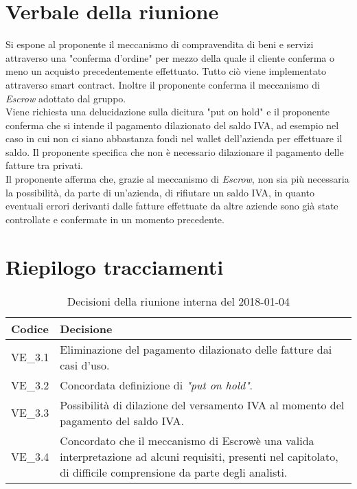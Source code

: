 \section{Verbale della riunione}
Si espone al proponente il meccanismo di compravendita di beni e servizi attraverso
una "conferma d'ordine\glo" per mezzo della quale il cliente conferma o meno un acquisto precedentemente effettuato.
Tutto ciò viene implementato attraverso smart contract\glo{}. Inoltre il proponente
conferma il meccanismo di \textit{Escrow\glo{}} adottato dal gruppo. \\
Viene richiesta una delucidazione sulla dicitura "put on hold" e il proponente conferma
che si intende il pagamento dilazionato del saldo IVA, ad esempio nel caso in cui non 
ci siano abbastanza fondi nel wallet\glo{} dell'azienda per effettuare il saldo. 
Il proponente specifica che non è necessario dilazionare il pagamento delle fatture 
tra privati. \\
Il proponente afferma che, grazie al meccanismo di \textit{Escrow\glo{}}, non sia più necessaria la possibilità, da parte di un'azienda, di rifiutare un saldo IVA, in quanto eventuali errori derivanti dalle fatture effettuate da altre aziende sono già state controllate e confermate in un momento precedente.

\pagebreak

\section{Riepilogo tracciamenti}

	
\begin{longtable}{ >{\centering}p{} >{}p{}}
	\caption{Decisioni della riunione interna del 2018-01-04}\\	
	\rowcolorhead
	\textbf{\color{white}Codice} 
	& \centering\textbf{\color{white}Decisione} 
	\tabularnewline 
	\endfirsthead
		VE\_3.1 & Eliminazione del pagamento dilazionato delle fatture dai casi d'uso.
		
		\tabularnewline 
		VE\_3.2 & Concordata definizione di \textit{"put on hold"}.
		
		\tabularnewline 
		VE\_3.3 & Possibilità di dilazione del versamento IVA al momento del 
						pagamento del saldo IVA.
		\tabularnewline 
		VE\_3.4 & Concordato che il meccanismo di Escrow\glosp è una valida interpretazione ad alcuni requisiti, presenti nel capitolato\glo, di difficile comprensione da parte degli analisti.

		
	\end{longtable}
	


